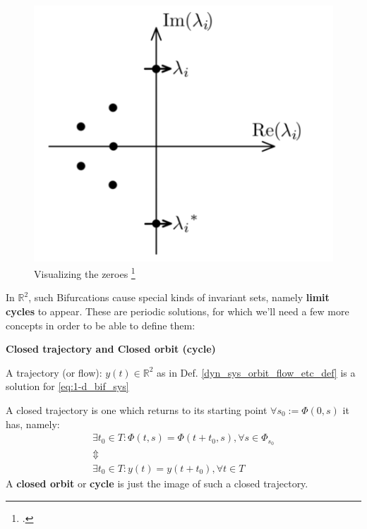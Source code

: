 \begin{figure}[H]
	\includegraphics[width=13cm]{math_pics/hopf-bif-eigenvalue-graph.png}
	\centering
	\caption{Visualizing the zeroes \footcite{vogel2020HopfEigenvalues}}
\end{figure}

In $\mathbb{R}^2$, such Bifurcations cause special kinds of invariant sets, namely \textbf{limit cycles} to appear. These are periodic solutions, for which we'll need a few more concepts in order to be able to define them:
\begin{definition} \textbf{Closed trajectory and Closed orbit (cycle)}

	A trajectory (or flow): $y(t) \in \mathbb{R}^2$ as in Def. \ref{dyn_sys_orbit_flow_etc_def} is a solution for \ref{eq:1-d_bif_sys}

	A closed trajectory is one which returns to its starting point $\forall s_0 := \Phi(0,s) $ it has, namely:
	\begin{gather*}
		\exists t_0 \in T : \Phi(t,s) = \Phi(t+t_0,s), \forall s \in \Phi_{s_0}     \\
		\Updownarrow \\
		\exists t_0 \in T : y(t) = y(t+t_0), \forall t \in T
	\end{gather*}
	A \textbf{closed orbit} or \textbf{cycle} is just the image of such a closed trajectory.
\end{definition}

